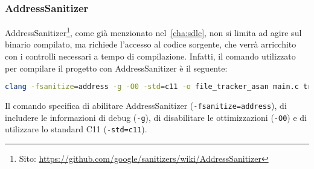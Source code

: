 \subsubsection*{AddressSanitizer}
AddressSanitizer\footnote{Sito: \url{https://github.com/google/sanitizers/wiki/AddressSanitizer}},
come già menzionato nel~\autoref{cha:sdlc}, non si limita ad agire sul binario
compilato, ma richiede l'accesso al codice sorgente, che verrà arricchito con i
controlli necessari a tempo di compilazione. Infatti, il comando utilizzato per
compilare il progetto con AddressSanitizer è il seguente: \begin{lstlisting}[language=bash, numbers=none]
clang -fsanitize=address -g -O0 -std=c11 -o file_tracker_asan main.c tracker_core.c utils.c
\end{lstlisting}

Il comando specifica di abilitare AddressSanitizer (\texttt{-fsanitize=address}),
di includere le informazioni di debug (\texttt{-g}), di disabilitare le
ottimizzazioni (\texttt{-O0}) e di utilizzare lo standard C11 (\texttt{-std=c11}).


